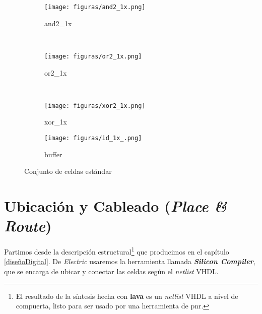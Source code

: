 \begin{figure}
        \centering
        \begin{subfigure}[b]{0.15\textwidth}
                \texttt{[image: figuras/and2\_1x.png]}
                \caption{and2\_1x}
                \label{fig:gull}
        \end{subfigure}\quad
        ~ %
        \begin{subfigure}[b]{0.15\textwidth}
                \texttt{[image: figuras/or2\_1x.png]}
                \caption{or2\_1x}
                \label{fig:tiger}
        \end{subfigure} 
        ~ %
        \begin{subfigure}[b]{0.15\textwidth}
                \texttt{[image: figuras/xor2\_1x.png]}
                \caption{xor\_1x}
                \label{fig:mouse}
        \end{subfigure}\qquad
        \begin{subfigure}[b]{0.15\textwidth}
                \texttt{[image: figuras/id\_1x\_.png]}
                \caption{buffer}
                \label{fig:mouse}
        \end{subfigure}
        \caption{Conjunto de celdas estándar}\label{fig:animals}
\end{figure}







\section{Ubicación y Cableado (\emph{Place \& Route})}
Partimos desde la descripción estructural\footnote{El resultado de la síntesis hecha con \textbf{lava} es un \emph{netlist} VHDL a nivel de compuerta, listo para ser usado por una herramienta de \gls{pnr}.} que producimos en el capítulo \ref{diseñoDigital}. De \emph{Electric} usaremos la herramienta llamada \textbf{\emph{Silicon Compiler}}, que se encarga de ubicar y conectar las celdas según el \emph{netlist} VHDL.

